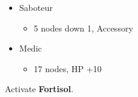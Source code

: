 \begin{multicols}{2}
\begin{menu}
\begin{itemize}
\begin{itemize}
\begin{itemize}
            \item Saboteur
            \begin{itemize}
                \item 5 nodes down 1, Accessory
            \end{itemize}
            \item Medic
            \begin{itemize}
                \item 17 nodes, HP +10
            \end{itemize}
        \end{itemize}
    \end{itemize}
    
\end{itemize}
\end{menu}
 Activate \textbf{Fortisol}.
\end{multicols}

